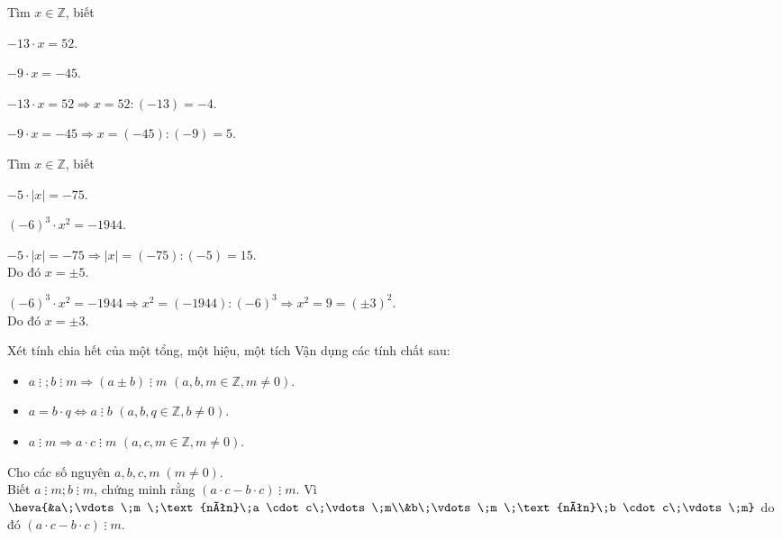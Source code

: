 \begin{vd}%
Tìm $ x\in \mathbb{Z} $, biết
\begin{enumEX}{2}
	\item $ -13 \cdot x=52 $.
	\item $ -9 \cdot x=-45 $.
\end{enumEX}	
	\loigiai
	{
\begin{enumEX}{1}
	\item $ -13 \cdot x=52 \Rightarrow x=52:(-13)=-4$.
	\item $ -9 \cdot x=-45 \Rightarrow x=(-45):(-9)=5$.
\end{enumEX}	
	}
\end{vd}


\begin{vd}%
Tìm $ x\in \mathbb{Z} $, biết
\begin{enumEX}{2}
	\item $ -5 \cdot |x|=-75 $.
	\item $ (-6)^3 \cdot x^2=-1944 $.
\end{enumEX}	
	\loigiai
	{
\begin{enumEX}{1}
	\item $ -5 \cdot |x|=-75 \Rightarrow |x|=(-75):(-5)=15$.\\
	Do đó $ x=\pm 5 $.
	\item $ (-6)^3 \cdot x^2=-1944 \Rightarrow x^2=(-1944):(-6)^3 \Rightarrow x^2=9=(\pm 3)^2$.\\
	Do đó $ x=\pm 3 $.
\end{enumEX}	
	}
\end{vd}




\begin{dang}{Xét tính chia hết của một tổng, một hiệu, một tích}
Vận dụng các tính chất sau:
\begin{itemize}
	\item $ a\;\vdots\;; b\;\vdots\;m \Rightarrow (a\pm b) \;\vdots\;m $ $ (a, b, m\in \mathbb{Z}, m \ne 0) $.
	\item $ a=b \cdot q \Leftrightarrow a \;\vdots\; b $ $ (a, b, q \in \mathbb{Z}, b \ne 0) $.
	\item $ a\;\vdots\;m \Rightarrow a \cdot c \;\vdots\;m $ $ (a, c, m \in \mathbb{Z}, m \ne 0) $.
\end{itemize}
\end{dang}

\begin{vd}%
Cho các số nguyên $ a, b, c, m \;(m\ne 0)$.\\
Biết $ a \;\vdots\;m; b \;\vdots\;m$, chứng minh rằng $ (a\cdot c-b\cdot c)\;\vdots\;m $.	
	\loigiai
	{
Vì $ \heva{&a\;\vdots\;m \;\text{nên}\;a \cdot c\;\vdots\;m\\&b\;\vdots\;m \;\text{nên}\;b \cdot c\;\vdots\;m} $	do đó $ (a\cdot c-b\cdot c)\;\vdots\;m $.	
	}
\end{vd}

